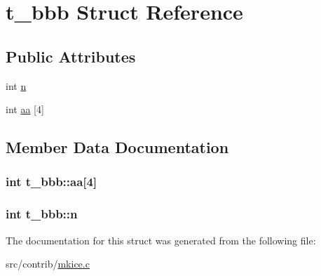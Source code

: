\hypertarget{structt__bbb}{\section{t\-\_\-bbb \-Struct \-Reference}
\label{structt__bbb}
}
\subsection*{\-Public \-Attributes}
\begin{DoxyCompactItemize}
\item 
int \hyperlink{structt__bbb_ad33d862fb953dd471fecdf73816bff1b}{n}
\item 
int \hyperlink{structt__bbb_a4652ddc13f99fba734684bc59c8dc7ef}{aa} \mbox{[}4\mbox{]}
\end{DoxyCompactItemize}


\subsection{\-Member \-Data \-Documentation}
\hypertarget{structt__bbb_a4652ddc13f99fba734684bc59c8dc7ef}{
\subsubsection[{aa}]{\setlength{\rightskip}{0pt plus 5cm}int {\bf t\-\_\-bbb\-::aa}\mbox{[}4\mbox{]}}}\label{structt__bbb_a4652ddc13f99fba734684bc59c8dc7ef}
\hypertarget{structt__bbb_ad33d862fb953dd471fecdf73816bff1b}{
\subsubsection[{n}]{\setlength{\rightskip}{0pt plus 5cm}int {\bf t\-\_\-bbb\-::n}}}\label{structt__bbb_ad33d862fb953dd471fecdf73816bff1b}


\-The documentation for this struct was generated from the following file\-:\begin{DoxyCompactItemize}
\item 
src/contrib/\hyperlink{mkice_8c}{mkice.\-c}\end{DoxyCompactItemize}
